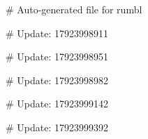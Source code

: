 # Auto-generated file for rumbl

# Update: 17923998911

# Update: 17923998951

# Update: 17923998982

# Update: 17923999142

# Update: 17923999392
